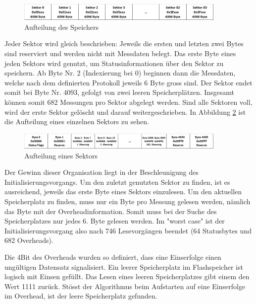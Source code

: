 \begin{figure}[H]
\begin{center}
\includegraphics[width=0.9\textwidth]{images/Software_Tabelle_2.png}
\caption{Aufteilung des Speichers}
\label{fig:Aufteilung_des_Speichers}
\end{center}
\end{figure}

Jeder Sektor wird gleich beschrieben: Jeweils die ersten und letzten zwei Bytes sind reserviert und werden nicht mit Messdaten belegt. Das erste Byte eines jeden Sektors wird genutzt, um Statusinformationen über den Sektor zu speichern. Ab Byte Nr. 2 (Indexierung bei 0) beginnen dann die Messdaten, welche nach dem definierten Protokoll jeweils 6 Byte gross sind. Der Sektor endet somit bei Byte Nr. 4093, gefolgt von zwei leeren Speicherplätzen. Insgesamt können somit 682 Messungen pro Sektor abgelegt werden. Sind alle Sektoren voll, wird der erste Sektor gelöscht und darauf weitergeschrieben. In Abbildung \ref{fig:Aufteilung_eines_Sektors} ist die Aufteilung eines einzelnen Sektors zu sehen.

\begin{figure}[H]
\begin{center}
\includegraphics[width=0.9\textwidth]{images/Software_Tabelle_3.png}
\caption{Aufteilung eines Sektors}
\label{fig:Aufteilung_eines_Sektors}
\end{center}
\end{figure}

Der Gewinn dieser Organisation liegt in der Beschleunigung des Initialisierungsvorgangs. Um den zuletzt genutzten Sektor zu finden, ist es ausreichend, jeweils das erste Byte eines Sektors einzulesen. Um den aktuellen Speicherplatz zu finden, muss nur ein Byte pro Messung gelesen werden, nämlich das Byte mit der Overheadinformation. Somit muss bei der Suche des Speicherplatzes nur jedes 6. Byte gelesen werden. Im "worst case"  ist der Initialisierungsvorgang also nach 746 Lesevorgängen beendet (64 Statusbytes und 682 Overheads).

Die 4Bit des Overheads wurden so definiert, dass eine Einserfolge einen ungültigen Datensatz signalisiert. Ein leerer Speicherplatz im Flashspeicher ist logisch mit Einsen gefüllt. Das Lesen eines leeren Speicherplatzes gibt einem den Wert  1111 \grqq  zurück. Stösst der Algorithmus beim Aufstarten auf eine Einserfolge im Overhead, ist der leere Speicherplatz gefunden. 

